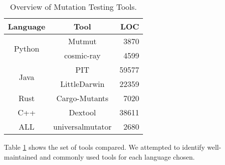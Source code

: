 \documentclass[sigconf,review, anonymous]{acmart}
\begin{document}
{\begin{table}[hbtp]
  \centering
  \caption{Overview of Mutation Testing Tools.}
  \label{tab:mutationtools}
  
  \begin{tabular}{|c|c|r|}
  \hline
  \textbf{Language} & \textbf{Tool} & \textbf{LOC}  \\
  \hline
  \multirow{2}{*}{Python}  & Mutmut &	3870  \\\cline{2-3}
      & cosmic-ray & 4599 \\ \hline
  \multirow{2}{*}{Java}  & PIT &	59577  \\\cline{2-3}
      & LittleDarwin & 22359 \\ \hline
      Rust & Cargo-Mutants & 7020 \\\hline
      C++ & Dextool & 38611 \\\hline
      ALL & universalmutator & 2680 \\\hline
  \end{tabular}
\end{table}

Table \ref{tab:mutationtools} shows the set of tools compared.  We
attempted to identify well-maintained and commonly used tools for each
language chosen.



\begin{table}[htbp]
\centering
\caption{C++ (UniversalMutator vs. Dextool)}
\label{tab:table_cpp2}
\end{table}}
\end{document}
